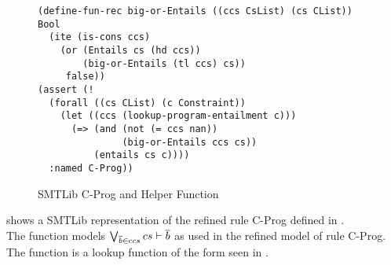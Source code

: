 %
\begin{figure}[t]
\begin{lstlisting}[language=smtlib]
(define-fun-rec big-or-Entails ((ccs CsList) (cs CList)) Bool
  (ite (is-cons ccs)
    (or (Entails cs (hd ccs))
        (big-or-Entails (tl ccs) cs))
     false))
(assert (!
  (forall ((cs CList) (c Constraint))
    (let ((ccs (lookup-program-entailment c)))
      (=> (and (not (= ccs nan))
               (big-or-Entails ccs cs))
          (entails cs c))))
  :named C-Prog))
\end{lstlisting}
\caption{SMTLib C-Prog and Helper Function}
\label{fig:smtlib-cprog}
\end{figure}
%
 shows a SMTLib representation
of the refined rule C-Prog defined in .\\
The function  models
$\bigvee_{\overline{b} \in ccs}{cs \vdash \overline{b}}$
as used in the refined model of rule C-Prog.
The function  is a lookup
function of the form seen in .

